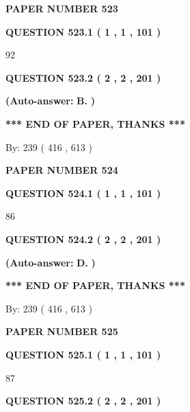 \documentclass[12pt]{article}
\begin{document}
   
\newpage 
\setcounter{page}{ 
   523001 } 
   
   
 {\textbf{ \Large{ PAPER NUMBER  523  }}}
   
   
   
   
  
  
{\textbf{\large{QUESTION
523.1 
 ( 1 , 1 , 101 )
}}}

92
  
  
{\textbf{\large{QUESTION
523.2 
 ( 2 , 2 , 201 )
}}}
 
 
{\textbf{(Auto-answer:}}
{\textbf{\large{
B.}}}
{\textbf{)}}
 
 
   
   
   
   
\vspace{1.0in} 
{\textbf{\large{ *** END OF PAPER, THANKS *** }}} 
   
   
\hspace{1.0in} By: 
 239 ( 416 ,  613 )
   
   
   
   
\newpage 
\setcounter{page}{ 
   524001 } 
   
   
 {\textbf{ \Large{ PAPER NUMBER  524  }}}
   
   
   
   
  
  
{\textbf{\large{QUESTION
524.1 
 ( 1 , 1 , 101 )
}}}

86
  
  
{\textbf{\large{QUESTION
524.2 
 ( 2 , 2 , 201 )
}}}
 
 
{\textbf{(Auto-answer:}}
{\textbf{\large{
D.}}}
{\textbf{)}}
 
 
   
   
   
   
\vspace{1.0in} 
{\textbf{\large{ *** END OF PAPER, THANKS *** }}} 
   
   
\hspace{1.0in} By: 
 239 ( 416 ,  613 )
   
   
   
   
\newpage 
\setcounter{page}{ 
   525001 } 
   
   
 {\textbf{ \Large{ PAPER NUMBER  525  }}}
   
   
   
   
  
  
{\textbf{\large{QUESTION
525.1 
 ( 1 , 1 , 101 )
}}}

87
  
  
{\textbf{\large{QUESTION
525.2 
 ( 2 , 2 , 201 )
}}}
 
\end{document}
